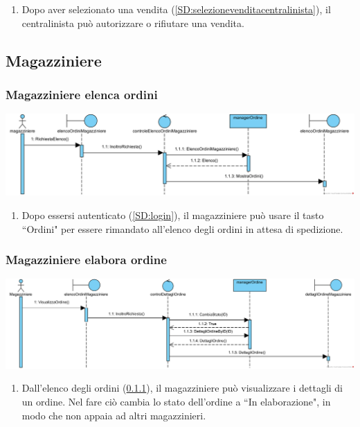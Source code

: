 \documentclass[12pt]{article}
\begin{document}
\begin{enumerate}
\item Dopo aver selezionato una vendita (\ref{SD:selezionevenditacentralinista}), il centralinista può autorizzare o rifiutare una vendita.
\end{enumerate}

\newpage

\subsection{Magazziniere}
\subsubsection{Magazziniere elenca ordini}
\label{SD:magazzinierevisualizzaelenco}
\begin{center}
\includegraphics[width=\textwidth]{SequenceDiagram/MagazziniereOrdiniElenco}
\end{center}

\begin{enumerate}
\item Dopo essersi autenticato (\ref{SD:login}), il magazziniere può usare il tasto ``Ordini" per essere rimandato all'elenco degli ordini in attesa di spedizione.
\end{enumerate}

\subsubsection{Magazziniere elabora ordine}
\label{SD:magazziniereblocca}
\begin{center}
\includegraphics[width=\textwidth]{SequenceDiagram/MagazziniereOrdineVisualizza}
\end{center}

\begin{enumerate}
\item Dall'elenco degli ordini (\ref{SD:magazzinierevisualizzaelenco}), il magazziniere può visualizzare i dettagli di un ordine. Nel fare ciò cambia lo stato dell'ordine a ``In elaborazione", in modo che non appaia ad altri magazzinieri.
\end{enumerate}
\end{document}
